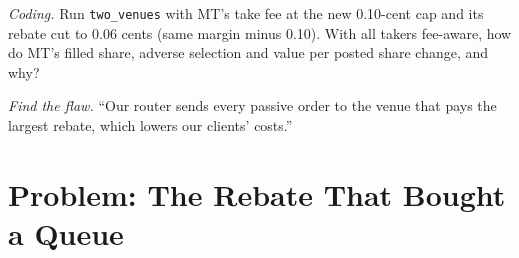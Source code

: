 \begin{exercise}[$\star\star\star$]\label{exo:mx:fees-rebates-and-venue-economics:7}
\emph{Coding.} Run \texttt{two\_venues} with MT's take fee at the new 0.10-cent cap and its rebate cut to 0.06 cents (same margin minus 0.10). With all
takers fee-aware, how do MT's filled share, adverse selection and value per posted share change, and why?
\end{exercise}

\begin{exercise}[$\star\star\star$]\label{exo:mx:fees-rebates-and-venue-economics:8}
\emph{Find the flaw.} ``Our router sends every passive order to the venue that pays the largest rebate, which lowers our clients' costs.''
\end{exercise}

\section{Problem: The Rebate That Bought a Queue}

